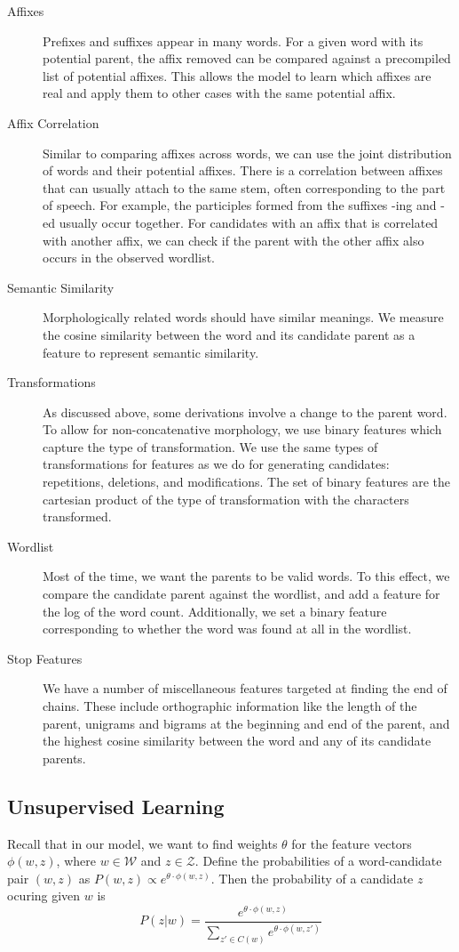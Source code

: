 \documentclass[11pt,twocolumn]{article}
\begin{document}
\begin{description}
    \item[Affixes] Prefixes and suffixes appear in many words. For a given word with its potential parent, the affix removed can be compared against a precompiled list of potential affixes. This allows the model to learn which affixes are real and apply them to other cases with the same potential affix.
    \item[Affix Correlation] Similar to comparing affixes across words, we can use the joint distribution of words and their potential affixes. There is a correlation between affixes that can usually attach to the same stem, often corresponding to the part of speech. For example, the participles formed from the suffixes -ing and -ed usually occur together. For candidates with an affix that is correlated with another affix, we can check if the parent with the other affix also occurs in the observed wordlist.
    \item[Semantic Similarity] Morphologically related words should have similar meanings. We measure the cosine similarity between the word and its candidate parent as a feature to represent semantic similarity.
    \item[Transformations] As discussed above, some derivations involve a change to the parent word. To allow for non-concatenative morphology, we use binary features which capture the type of transformation. We use the same types of transformations for features as we do for generating candidates: repetitions, deletions, and modifications. The set of binary features are the cartesian product of the type of transformation with the characters transformed.
    \item[Wordlist] Most of the time, we want the parents to be valid words. To this effect, we compare the candidate parent against the wordlist, and add a feature for the log of the word count. Additionally, we set a binary feature corresponding to whether the word was found at all in the wordlist.
    \item[Stop Features] We have a number of miscellaneous features targeted at finding the end of chains. These include orthographic information like the length of the parent, unigrams and bigrams at the beginning and end of the parent, and the highest cosine similarity between the word and any of its candidate parents.
\end{description}

\subsection{Unsupervised Learning}
Recall that in our model, we want to find weights $\theta$ for the feature vectors $\phi(w,z)$, where $w\in\mathcal W$ and $z\in\mathcal Z$. Define the probabilities of a word-candidate pair $(w,z)$ as $P(w,z)\propto e^{\theta\cdot\phi(w,z)}$. Then the probability of a candidate $z$ ocuring given $w$ is
\begin{equation}
    P(z|w) = \frac{e^{\theta\cdot\phi(w,z)}} {\sum_{z'\in C(w)} e^{\theta\cdot\phi(w,z')}}
\end{equation}
\end{document}
